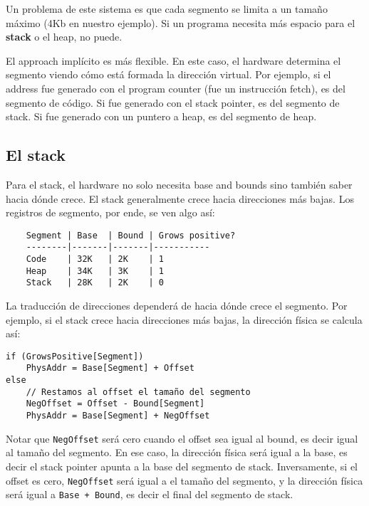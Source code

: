 \documentclass[12pt]{article}
\theoremstyle{definition}
\begin{document}
Un problema de este sistema es que cada segmento se limita a un tamaño máximo
(4Kb en nuestro ejemplo). Si un programa necesita más espacio para el
\textbf{stack} o el heap, no puede. 

El approach implícito es más flexible. En este caso, el hardware determina el
segmento viendo cómo está formada la dirección virtual. Por ejemplo, si el
address fue generado con el program counter (fue un instrucción fetch), es del
segmento de código. Si fue generado con el stack pointer, es del segmento de
stack. Si fue generado con un puntero a heap, es del segmento de heap.

\subsection{El stack}

Para el stack, el hardware no solo necesita base and bounds sino también saber
hacia dónde crece. El stack generalmente crece hacia direcciones más bajas. Los
registros de segmento, por ende, se ven algo así: 

\begin{verbatim}
    Segment | Base  | Bound | Grows positive?
    --------|-------|-------|-----------
    Code    | 32K   | 2K    | 1
    Heap    | 34K   | 3K    | 1
    Stack   | 28K   | 2K    | 0
\end{verbatim}

La traducción de direcciones dependerá de hacia dónde crece el segmento.  
Por ejemplo, si el stack crece hacia direcciones más bajas, la dirección
física se calcula así:

\footnotesize
\begin{verbatim}
if (GrowsPositive[Segment])
    PhysAddr = Base[Segment] + Offset
else 
    // Restamos al offset el tamaño del segmento
    NegOffset = Offset - Bound[Segment] 
    PhysAddr = Base[Segment] + NegOffset
\end{verbatim}
\normalsize

Notar que \texttt{NegOffset} será cero cuando el offset sea igual al bound, es
decir igual al tamaño del segmento. En ese caso, la dirección física será igual
a la base, es decir el stack pointer apunta a la base del segmento de stack.
Inversamente, si el offset es cero, \texttt{NegOffset} será igual a el tamaño
del segmento, y la dirección física será igual a \texttt{Base + Bound}, es decir
el final del segmento de stack.
\end{document}
